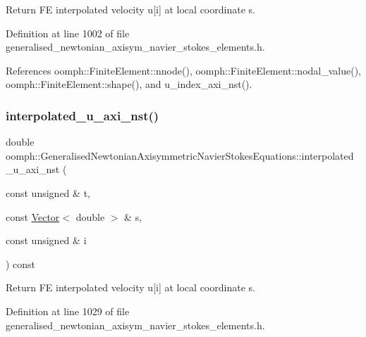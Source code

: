 Return FE interpolated velocity u\mbox{[}i\mbox{]} at local coordinate s. 



Definition at line 1002 of file generalised\+\_\+newtonian\+\_\+axisym\+\_\+navier\+\_\+stokes\+\_\+elements.\+h.



References oomph\+::\+Finite\+Element\+::nnode(), oomph\+::\+Finite\+Element\+::nodal\+\_\+value(), oomph\+::\+Finite\+Element\+::shape(), and u\+\_\+index\+\_\+axi\+\_\+nst().

\mbox{\label{classoomph_1_1GeneralisedNewtonianAxisymmetricNavierStokesEquations_ad3eb5c16ef5aae9e1b66f52b371629df}} 
\subsubsection{\texorpdfstring{interpolated\+\_\+u\+\_\+axi\+\_\+nst()}{interpolated\_u\_axi\_nst()}\hspace{0.1cm}{\footnotesize\ttfamily [3/3]}}
{\footnotesize\ttfamily double oomph\+::\+Generalised\+Newtonian\+Axisymmetric\+Navier\+Stokes\+Equations\+::interpolated\+\_\+u\+\_\+axi\+\_\+nst (\begin{DoxyParamCaption}\item[{const unsigned \&}]{t,  }\item[{const \hyperlink{classoomph_1_1Vector}{Vector}$<$ double $>$ \&}]{s,  }\item[{const unsigned \&}]{i }\end{DoxyParamCaption}) const\hspace{0.3cm}{\ttfamily [inline]}}



Return FE interpolated velocity u\mbox{[}i\mbox{]} at local coordinate s. 



Definition at line 1029 of file generalised\+\_\+newtonian\+\_\+axisym\+\_\+navier\+\_\+stokes\+\_\+elements.\+h.



